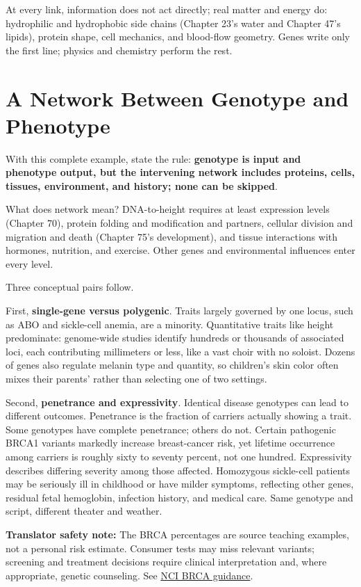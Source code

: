 At every link, information does not act directly; real matter and energy do: hydrophilic and hydrophobic side chains (Chapter 23's water and Chapter 47's lipids), protein shape, cell mechanics, and blood-flow geometry. Genes write only the first line; physics and chemistry perform the rest.

\section{A Network Between Genotype and Phenotype}

With this complete example, state the rule: \textbf{genotype is input and phenotype output, but the intervening network includes proteins, cells, tissues, environment, and history; none can be skipped}.

What does network mean? DNA-to-height requires at least expression levels (Chapter 70), protein folding and modification and partners, cellular division and migration and death (Chapter 75's development), and tissue interactions with hormones, nutrition, and exercise. Other genes and environmental influences enter every level.

Three conceptual pairs follow.

First, \textbf{single-gene versus polygenic}. Traits largely governed by one locus, such as ABO and sickle-cell anemia, are a minority. Quantitative traits like height predominate: genome-wide studies identify hundreds or thousands of associated loci, each contributing millimeters or less, like a vast choir with no soloist. Dozens of genes also regulate melanin type and quantity, so children's skin color often mixes their parents' rather than selecting one of two settings.

Second, \textbf{penetrance and expressivity}. Identical disease genotypes can lead to different outcomes. Penetrance is the fraction of carriers actually showing a trait. Some genotypes have complete penetrance; others do not. Certain pathogenic BRCA1 variants markedly increase breast-cancer risk, yet lifetime occurrence among carriers is roughly sixty to seventy percent, not one hundred. Expressivity describes differing severity among those affected. Homozygous sickle-cell patients may be seriously ill in childhood or have milder symptoms, reflecting other genes, residual fetal hemoglobin, infection history, and medical care. Same genotype and script, different theater and weather.

\textbf{Translator safety note:} The BRCA percentages are source teaching examples, not a personal risk estimate. Consumer tests may miss relevant variants; screening and treatment decisions require clinical interpretation and, where appropriate, genetic counseling. See \href{https://www.cancer.gov/about-cancer/causes-prevention/genetics/brca-fact-sheet}{NCI BRCA guidance}.

